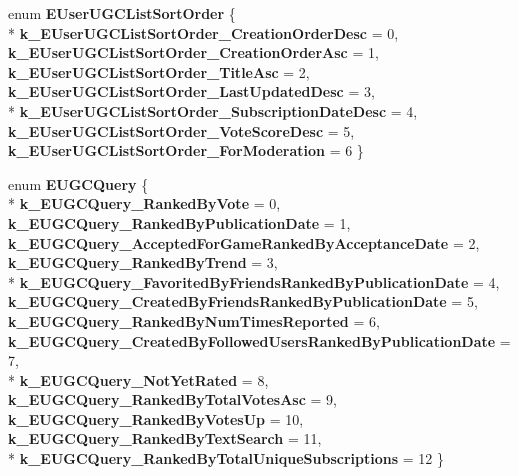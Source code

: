 \begin{DoxyCompactItemize}
\item 
\hypertarget{namespaceValve_1_1Steamworks_ad129255cf00d8d70b51fa282429e26b6}{}enum {\bfseries E\+User\+U\+G\+C\+List\+Sort\+Order} \{ \\*
{\bfseries k\+\_\+\+E\+User\+U\+G\+C\+List\+Sort\+Order\+\_\+\+Creation\+Order\+Desc} = 0, 
{\bfseries k\+\_\+\+E\+User\+U\+G\+C\+List\+Sort\+Order\+\_\+\+Creation\+Order\+Asc} = 1, 
{\bfseries k\+\_\+\+E\+User\+U\+G\+C\+List\+Sort\+Order\+\_\+\+Title\+Asc} = 2, 
{\bfseries k\+\_\+\+E\+User\+U\+G\+C\+List\+Sort\+Order\+\_\+\+Last\+Updated\+Desc} = 3, 
\\*
{\bfseries k\+\_\+\+E\+User\+U\+G\+C\+List\+Sort\+Order\+\_\+\+Subscription\+Date\+Desc} = 4, 
{\bfseries k\+\_\+\+E\+User\+U\+G\+C\+List\+Sort\+Order\+\_\+\+Vote\+Score\+Desc} = 5, 
{\bfseries k\+\_\+\+E\+User\+U\+G\+C\+List\+Sort\+Order\+\_\+\+For\+Moderation} = 6
 \}\label{namespaceValve_1_1Steamworks_ad129255cf00d8d70b51fa282429e26b6}

\item 
\hypertarget{namespaceValve_1_1Steamworks_aac3fab43488ce6e87b3e5504f8874213}{}enum {\bfseries E\+U\+G\+C\+Query} \{ \\*
{\bfseries k\+\_\+\+E\+U\+G\+C\+Query\+\_\+\+Ranked\+By\+Vote} = 0, 
{\bfseries k\+\_\+\+E\+U\+G\+C\+Query\+\_\+\+Ranked\+By\+Publication\+Date} = 1, 
{\bfseries k\+\_\+\+E\+U\+G\+C\+Query\+\_\+\+Accepted\+For\+Game\+Ranked\+By\+Acceptance\+Date} = 2, 
{\bfseries k\+\_\+\+E\+U\+G\+C\+Query\+\_\+\+Ranked\+By\+Trend} = 3, 
\\*
{\bfseries k\+\_\+\+E\+U\+G\+C\+Query\+\_\+\+Favorited\+By\+Friends\+Ranked\+By\+Publication\+Date} = 4, 
{\bfseries k\+\_\+\+E\+U\+G\+C\+Query\+\_\+\+Created\+By\+Friends\+Ranked\+By\+Publication\+Date} = 5, 
{\bfseries k\+\_\+\+E\+U\+G\+C\+Query\+\_\+\+Ranked\+By\+Num\+Times\+Reported} = 6, 
{\bfseries k\+\_\+\+E\+U\+G\+C\+Query\+\_\+\+Created\+By\+Followed\+Users\+Ranked\+By\+Publication\+Date} = 7, 
\\*
{\bfseries k\+\_\+\+E\+U\+G\+C\+Query\+\_\+\+Not\+Yet\+Rated} = 8, 
{\bfseries k\+\_\+\+E\+U\+G\+C\+Query\+\_\+\+Ranked\+By\+Total\+Votes\+Asc} = 9, 
{\bfseries k\+\_\+\+E\+U\+G\+C\+Query\+\_\+\+Ranked\+By\+Votes\+Up} = 10, 
{\bfseries k\+\_\+\+E\+U\+G\+C\+Query\+\_\+\+Ranked\+By\+Text\+Search} = 11, 
\\*
{\bfseries k\+\_\+\+E\+U\+G\+C\+Query\+\_\+\+Ranked\+By\+Total\+Unique\+Subscriptions} = 12
 \}\label{namespaceValve_1_1Steamworks_aac3fab43488ce6e87b3e5504f8874213}


\end{DoxyCompactItemize}
